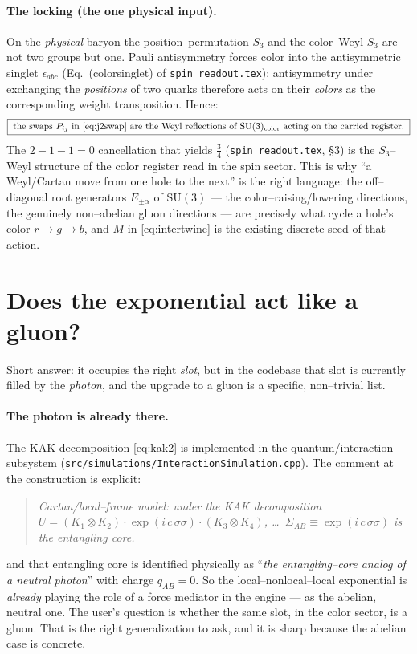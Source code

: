\documentclass[11pt,oneside]{article}
\newcommand{\code}[1]{\texttt{#1}}
\newcommand{\SU}{\mathrm{SU}}
\theoremstyle{plain}
\begin{document}
\paragraph{The locking (the one physical input).}
On the \emph{physical} baryon the position--permutation $S_3$ and the
color--Weyl $S_3$ are not two groups but one. Pauli antisymmetry forces color into
the antisymmetric singlet $\epsilon_{abc}$ (Eq.~(colorsinglet) of
\code{spin\_readout.tex}); antisymmetry under exchanging the \emph{positions} of
two quarks therefore acts on their \emph{colors} as the corresponding weight
transposition. Hence:
\begin{equation}
  \boxed{\;\text{the swaps }P_{ij}\text{ in }\eqref{eq:j2swap}
          \text{ are the Weyl reflections of }\SU(3)_{\text{color}}
          \text{ acting on the carried register.}\;}
\end{equation}
The $2-1-1=0$ cancellation that yields $\tfrac34$ (\code{spin\_readout.tex},
\S3) is the $S_3$--Weyl structure of the color register read in the spin sector.
This is why ``a Weyl/Cartan move from one hole to the next'' is the right
language: the off--diagonal root generators $E_{\pm\alpha}$ of $\SU(3)$ --- the
color--raising/lowering directions, the genuinely non--abelian gluon directions
--- are precisely what cycle a hole's color $r\!\to\!g\!\to\!b$, and $M$ in
\eqref{eq:intertwine} is the existing discrete seed of that action.

\section{Does the exponential act like a gluon?}
\label{sec:gluon}

Short answer: it occupies the right \emph{slot}, but in the codebase that slot is
currently filled by the \emph{photon}, and the upgrade to a gluon is a specific,
non--trivial list.

\paragraph{The photon is already there.}
The KAK decomposition \eqref{eq:kak2} is implemented in the quantum/interaction
subsystem (\code{src/simulations/InteractionSimulation.cpp}). The comment at the
construction is explicit:
\begin{quote}\small
\emph{Cartan/local--frame model: under the KAK decomposition
$U=(K_1\!\otimes\!K_2)\cdot\exp(i\,c\,\sigma\sigma)\cdot(K_3\!\otimes\!K_4)$,
\dots\ $\Sigma_{AB}\equiv\exp(i\,c\,\sigma\sigma)$ is the entangling core.}
\end{quote}
and that entangling core is identified physically as ``\emph{the entangling--core
analog of a neutral photon}'' with charge $q_{AB}=0$. So the local--nonlocal--local
exponential is \emph{already} playing the role of a force mediator in the engine
--- as the abelian, neutral one. The user's question is whether the same slot, in
the color sector, is a gluon. That is the right generalization to ask, and it is
sharp because the abelian case is concrete.
\end{document}
